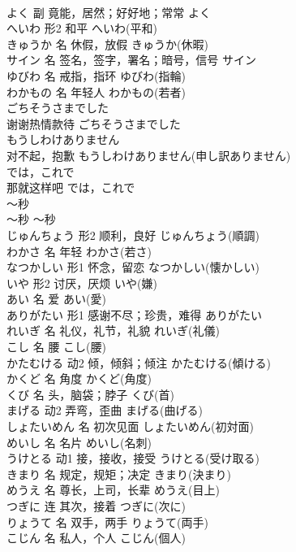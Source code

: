 \documentclass[8pt]{extreport}
\begin{document}
\begin{CJK}{UTF8}{min}
\\	よく	副	竟能，居然；好好地；常常	よく	
\\	へいわ	形2	和平	へいわ(平和)	
\\	きゅうか	名	休假，放假	きゅうか(休暇)	
\\	サイン	名	签名，签字，署名；暗号，信号	サイン	
\\	ゆびわ	名	戒指，指环	ゆびわ(指輪)	
\\	わかもの	名	年轻人	わかもの(若者)	
\\	ごちそうさまでした	
\\	谢谢热情款待	ごちそうさまでした	
\\	もうしわけありません	
\\	对不起，抱歉	もうしわけありません(申し訳ありません)	
\\	では，これで	
\\	那就这样吧	では，これで	
\\	～秒	
\\	～秒	～秒	
\\	じゅんちょう	形2	顺利，良好	じゅんちょう(順調)	
\\	わかさ	名	年轻	わかさ(若さ)	
\\	なつかしい	形1	怀念，留恋	なつかしい(懐かしい)	
\\	いや	形2	讨厌，厌烦	いや(嫌)	
\\	あい	名	爱	あい(愛)	
\\	ありがたい	形1	感谢不尽；珍贵，难得	ありがたい	
\\	れいぎ	名	礼仪，礼节，礼貌	れいぎ(礼儀)	
\\	こし	名	腰	こし(腰)	
\\	かたむける	动2	倾，倾斜；倾注	かたむける(傾ける)	
\\	かくど	名	角度	かくど(角度)	
\\	くび	名	头，脑袋；脖子	くび(首)	
\\	まげる	动2	弄弯，歪曲	まげる(曲げる)	
\\	しょたいめん	名	初次见面	しょたいめん(初対面)	
\\	めいし	名	名片	めいし(名刺)	
\\	うけとる	动1	接，接收，接受	うけとる(受け取る)	
\\	きまり	名	规定，规矩；决定	きまり(決まり)	
\\	めうえ	名	尊长，上司，长辈	めうえ(目上)	
\\	つぎに	连	其次，接着	つぎに(次に)	
\\	りょうて	名	双手，两手	りょうて(両手)	
\\	こじん	名	私人，个人	こじん(個人)	

\end{CJK}
\end{document}
